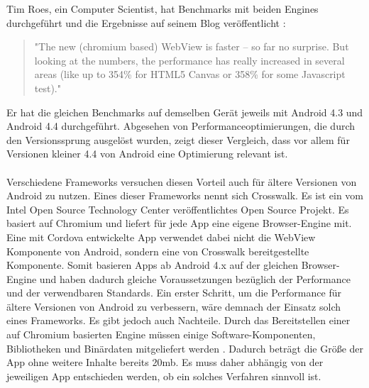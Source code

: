 Tim Roes, ein Computer Scientist, hat Benchmarks mit beiden Engines durchgeführt und die Ergebnisse auf seinem Blog veröffentlicht \cite{android-webview-benchmark}: 
\begin{quote}
"The new (chromium based) WebView is faster – so far no surprise. But looking at the numbers, the performance has really increased in several areas (like up to 354\% for HTML5 Canvas or 358\% for some Javascript test)."
\end{quote}
Er hat die gleichen Benchmarks auf demselben Gerät jeweils mit Android 4.3 und Android 4.4 durchgeführt. Abgesehen von Performanceoptimierungen, die durch den Versionssprung ausgelöst wurden, zeigt dieser Vergleich, dass vor allem für Versionen kleiner 4.4 von Android eine Optimierung relevant ist. 
\\\\
Verschiedene Frameworks versuchen diesen Vorteil auch für ältere Versionen von Android zu nutzen. Eines dieser Frameworks nennt sich  Crosswalk. Es ist ein vom Intel Open Source Technology Center veröffentlichtes Open Source Projekt. Es basiert auf Chromium und liefert für jede App eine eigene Browser-Engine mit. Eine mit Cordova entwickelte App verwendet dabei nicht die \gls{WebView} Komponente von Android, sondern eine von Crosswalk bereitgestellte Komponente. Somit basieren Apps ab Android 4.x auf der gleichen Browser-Engine und haben dadurch gleiche Voraussetzungen bezüglich der Performance und der verwendbaren Standards. Ein erster Schritt, um die Performance für ältere Versionen von Android zu verbessern, wäre demnach der Einsatz solch eines Frameworks. Es gibt jedoch auch Nachteile. Durch das Bereitstellen einer auf Chromium basierten Engine müssen einige Software-Komponenten, Bibliotheken und Binärdaten mitgeliefert werden \cite{crosswalk}. Dadurch beträgt die Größe der App ohne weitere Inhalte bereits \mytilde20mb. Es muss daher abhängig von der jeweiligen App entschieden werden, ob ein solches Verfahren sinnvoll ist.